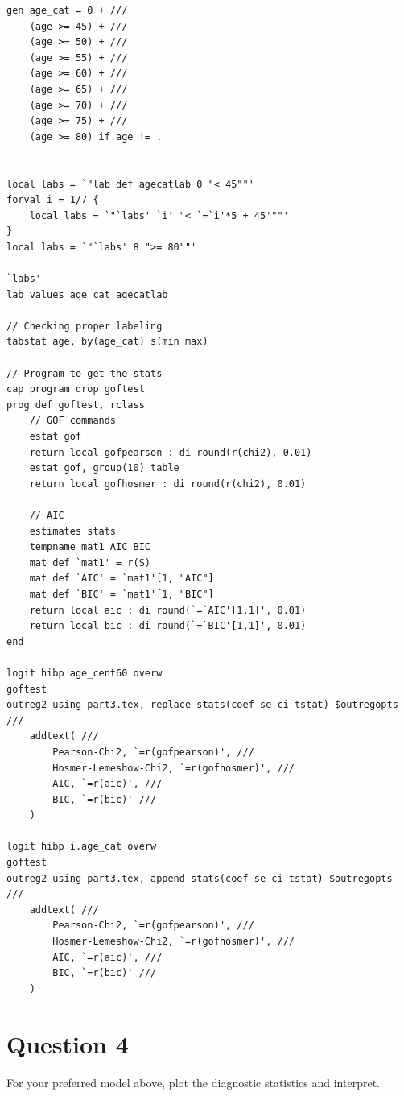\documentclass{article}
\begin{document}
\begin{enumerate}[a.]
\begin{verbatim}
gen age_cat = 0 + ///
    (age >= 45) + ///
    (age >= 50) + ///
    (age >= 55) + ///
    (age >= 60) + ///
    (age >= 65) + ///
    (age >= 70) + ///
    (age >= 75) + ///
    (age >= 80) if age != .


local labs = `"lab def agecatlab 0 "< 45""'
forval i = 1/7 {
	local labs = `"`labs' `i' "< `=`i'*5 + 45'""'
}
local labs = `"`labs' 8 ">= 80""'

`labs'
lab values age_cat agecatlab 

// Checking proper labeling
tabstat age, by(age_cat) s(min max)

// Program to get the stats
cap program drop goftest
prog def goftest, rclass
    // GOF commands
    estat gof
    return local gofpearson : di round(r(chi2), 0.01)
    estat gof, group(10) table
    return local gofhosmer : di round(r(chi2), 0.01)
    
    // AIC
    estimates stats
    tempname mat1 AIC BIC
    mat def `mat1' = r(S)
    mat def `AIC' = `mat1'[1, "AIC"]
    mat def `BIC' = `mat1'[1, "BIC"]
    return local aic : di round(`=`AIC'[1,1]', 0.01)
    return local bic : di round(`=`BIC'[1,1]', 0.01)
end

logit hibp age_cent60 overw
goftest
outreg2 using part3.tex, replace stats(coef se ci tstat) $outregopts ///
    addtext( ///
        Pearson-Chi2, `=r(gofpearson)', ///
        Hosmer-Lemeshow-Chi2, `=r(gofhosmer)', ///
        AIC, `=r(aic)', ///
        BIC, `=r(bic)' ///
    )

logit hibp i.age_cat overw
goftest
outreg2 using part3.tex, append stats(coef se ci tstat) $outregopts ///
    addtext( ///
        Pearson-Chi2, `=r(gofpearson)', ///
        Hosmer-Lemeshow-Chi2, `=r(gofhosmer)', ///
        AIC, `=r(aic)', ///
        BIC, `=r(bic)' ///
    )
\end{verbatim}

    
\end{enumerate}

\section{Question 4}
 For your preferred model above, plot the diagnostic statistics and interpret. 
 
\end{document}
